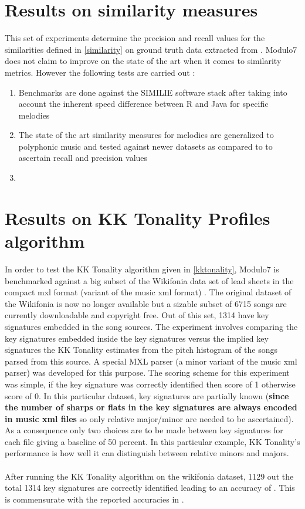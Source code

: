 \section{Results on similarity measures}

\noindent This set of experiments determine the precision and recall values for the similarities defined in \ref{similarity} on ground truth data extracted from \cite{msd}. Modulo7 does not claim to improve on the state of the art when it comes to similarity metrics. However the following tests are carried out : 

\begin{enumerate}
\item Benchmarks are done against the SIMILIE software stack \cite{similie} after taking into account the inherent speed difference between R\cite{similietechnicalmanual} and Java for specific melodies
\item The state of the art similarity measures for melodies are generalized to polyphonic music and tested against newer datasets as compared to \cite{msd} to ascertain recall and precision values
\item 
\end{enumerate}  

\section{Results on KK Tonality Profiles algorithm}

\noindent In order to test the KK Tonality algorithm given in \ref{kktonality}, Modulo7 is benchmarked against a big subset of the Wikifonia data set of lead sheets in the compact mxl format (variant of the music xml format) \cite{WikifoniaDataset}. The original dataset of the Wikifonia is now no longer available but a sizable subset of 6715 songs are currently downloadable and copyright free. Out of this set, 1314 have key signatures embedded in the song sources. The experiment involves comparing the key signatures embedded inside the key signatures versus the implied key signatures the KK Tonality estimates from the pitch histogram of the songs parsed from this source. A special MXL parser (a minor variant of the music xml parser) was developed for this purpose. The scoring scheme for this experiment was simple, if the key signature was correctly identified then score of 1 otherwise score of 0. In this particular dataset, key signatures are partially known (\textbf{since the number of sharps or flats in the key signatures are always encoded in music xml files} so only relative major/minor are needed to be ascertained). As a consequence only two choices are to be made between key signatures for each file giving a baseline of 50 percent. In this particular example, KK Tonality's performance is how well it can distinguish between relative minors and majors. \\\\
After running the KK Tonality algorithm on the wikifonia dataset, 1129 out the total 1314 key signatures are correctly identified leading to an accuracy of . This is commensurate with the reported accuracies in \cite{kkTonalityKeyFinding}.


